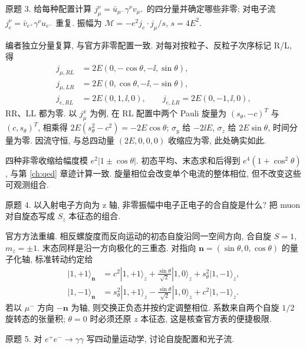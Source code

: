 \begin{exercise}\label{ex:8701-3-3}
原题 3. 给每种配置计算 $j_\mu^\nu=\bar u_{\mu^-}\gamma^\nu v_{\mu^+}$ 的四分量并确定哪些非零; 对电子流 $j_e^\nu=\bar v_{e^+}\gamma^\nu u_{e^-}$ 重复. 振幅为 $\mathcal M=-e^2j_e\cdot j_\mu/s$, $s=4E^2$.
\end{exercise}
\begin{solution}
编者独立分量复算, 与官方非零配置一致. 对每对按粒子、反粒子次序标记 R/L, 得
\begin{align*}
 j_{\mu,RL}&=2E(0,-\cos\theta,-\ii,\sin\theta),\\
 j_{\mu,LR}&=2E(0,\cos\theta,-\ii,-\sin\theta),\\
 j_{e,RL}&=2E(0,1,\ii,0),\qquad j_{e,LR}=2E(0,-1,\ii,0),
\end{align*}
RR、LL 都为零. 以 $j_\mu^x$ 为例, 在 RL 配置中两个 Pauli 旋量为 $(s_\theta,-c)^T$ 与 $(c,s_\theta)^T$, 相乘得 $2E(s_\theta^2-c^2)=-2E\cos\theta$; $\sigma_y$ 给 $-2\ii E$, $\sigma_z$ 给 $2E\sin\theta$, 时间分量为零. 因流守恒, 与总四动量 $(2E,0,0,0)$ 收缩应为零, 此处确实如此.

四种非零收缩给幅度模 $e^2|1\pm\cos\theta|$. 初态平均、末态求和后得到 $e^4(1+\cos^2\theta)$, 与第 \ref{ch:qed} 章迹计算一致. 旋量相位会改变单个电流的整体相位, 但不改变这些可观测组合.
\end{solution}
\begin{exercise}\label{ex:8701-3-4}
原题 4. 以入射电子方向为 z 轴, 非零振幅中电子正电子的合自旋是什么? 把 muon 对自旋态写成 $S_z$ 本征态的组合.
\end{exercise}
\begin{solution}
官方方法重编. 相反螺旋度而反向运动的初态自旋沿同一空间方向, 合自旋 $S=1$, $m_z=\pm1$. 末态同样是沿一方向极化的三重态. 对指向 $\mathbf n=(\sin\theta,0,\cos\theta)$ 的量子化轴, 标准转动约定给
\begin{align*}
 |1,+1\rangle_{\mathbf n}&=c^2|1,+1\rangle_z+\frac{\sin\theta}{\sqrt2}|1,0\rangle_z+s_\theta^2|1,-1\rangle_z,\\
 |1,-1\rangle_{\mathbf n}&=s_\theta^2|1,+1\rangle_z-\frac{\sin\theta}{\sqrt2}|1,0\rangle_z+c^2|1,-1\rangle_z.
\end{align*}
若以 $\mu^-$ 方向 $-\mathbf n$ 为轴, 则交换正负态并按约定调整相位. 系数来自两个自旋 $1/2$ 旋转态的张量积; $\theta=0$ 时必须还原 $z$ 本征态, 这是核查官方表的便捷极限.
\end{solution}
\begin{exercise}\label{ex:8701-3-5}
原题 5. 对 $e^+e^-\to\gamma\gamma$ 写四动量运动学, 讨论自旋配置和光子流.
\end{exercise}
